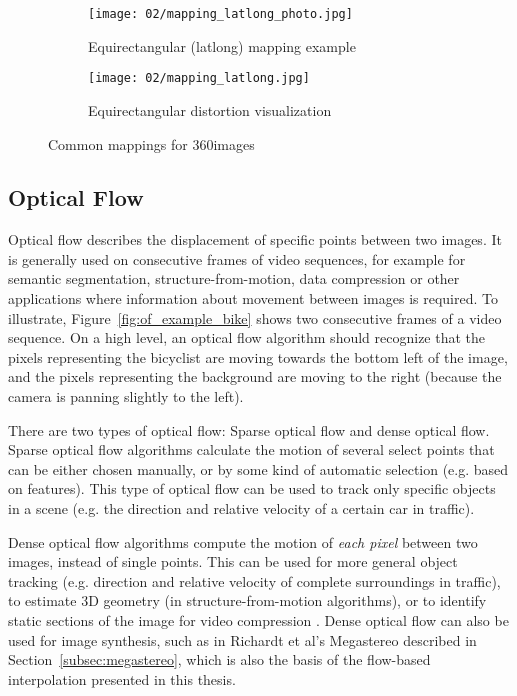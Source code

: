 \begin{figure}
    \hfill
    \begin{subfigure}[t]{0.5\textwidth} 
            \centering
            \texttt{[image: 02/mapping\_latlong\_photo.jpg]}
            \caption{Equirectangular (latlong) mapping example}
    \end{subfigure}%
    \hfill
    \begin{subfigure}[t]{0.5\textwidth}
            \centering
            \texttt{[image: 02/mapping\_latlong.jpg]}
            \caption{Equirectangular distortion visualization}\label{fig:latlong-intro}
    \end{subfigure}
    \hfill
    \caption{Common mappings for 360\degree images}\label{fig:common_mappings}
  \end{figure}
  
\subsection{Optical Flow} \label{subsec:optical_flow}
Optical flow describes the displacement of specific points between two images. It is generally used on consecutive frames of video sequences, for example for semantic segmentation, structure-from-motion, data compression or other applications where information about movement between images is required. To illustrate, Figure~\ref{fig:of_example_bike} shows two consecutive frames of a video sequence. On a high level, an optical flow algorithm should recognize that the pixels representing the bicyclist are moving towards the bottom left of the image, and the pixels representing the background are moving to the right (because the camera is panning slightly to the left).

There are two types of optical flow: Sparse optical flow and dense optical flow. Sparse optical flow algorithms calculate the motion of several select points that can be either chosen manually, or by some kind of automatic selection (e.g. based on features). This type of optical flow can be used to track only specific objects in a scene (e.g. the direction and relative velocity of a certain car in traffic).

Dense optical flow algorithms compute the motion of \emph{each pixel} between two images, instead of single points. This can be used for more general object tracking (e.g. direction and relative velocity of complete surroundings in traffic), to estimate 3D geometry (in structure-from-motion algorithms), or to identify static sections of the image for video compression \cite{of-survey}. Dense optical flow can also be used for image synthesis, such as in Richardt et al's Megastereo \cite{megastereo} described in Section~\ref{subsec:megastereo}, which is also the basis of the flow-based interpolation presented in this thesis.


